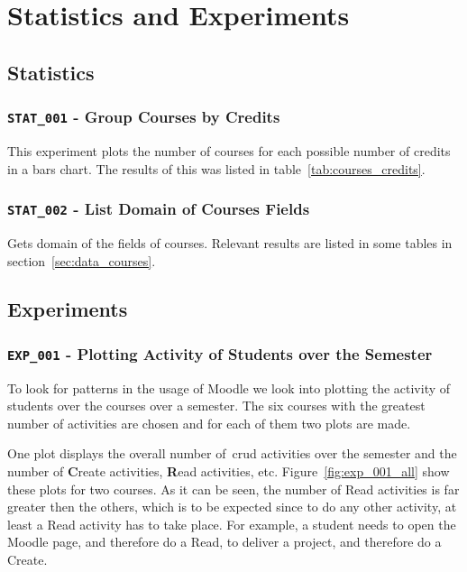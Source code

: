 \chapter{Statistics and Experiments}

\section{Statistics}

\subsection{\texttt{STAT\_001} - Group Courses by Credits}

This experiment plots the number of courses for each possible number of credits
in a bars chart. The results of this was listed in
table~\ref{tab:courses_credits}.

\subsection{\texttt{STAT\_002} - List Domain of Courses Fields}

Gets domain of the fields of courses. Relevant results are listed in some
tables in section~\ref{sec:data_courses}.

\section{Experiments}

\subsection{\texttt{EXP\_001} - Plotting Activity of Students over the
Semester}

To look for patterns in the usage of Moodle we look into plotting the activity
of students over the courses over a semester. The six courses with the greatest
number of activities are chosen and for each of them two plots are made.

One plot displays the overall number of~\gls{crud} activities over the semester
and the number of \textbf{C}reate activities, \textbf{R}ead activities, etc.
Figure~\ref{fig:exp_001_all} show these plots for two courses. As it can be
seen, the number of Read activities is far greater then the others, which is to
be expected since to do any other activity, at least a Read activity has to
take place. For example, a student needs to open the Moodle page, and therefore
do a Read, to deliver a project, and therefore do a Create.

